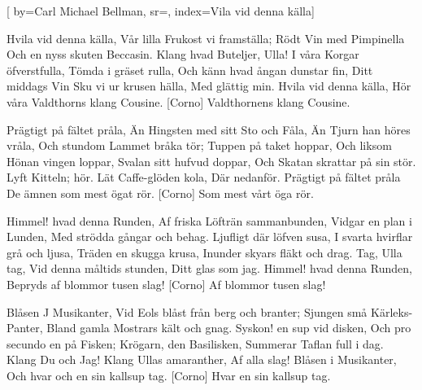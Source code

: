 

[ 		%
	by={Carl Michael Bellman},					%
	sr={},					%
	index={Vila vid denna källa}]						%

\beginverse*						%
Hvila vid denna källa,
Vår lilla Frukost vi framställa;
Rödt Vin med Pimpinella
Och en nyss skuten Beccasin.
Klang hvad Buteljer, Ulla!
I våra Korgar öfverstfulla,
Tömda i gräset rulla,
Och känn hvad ångan dunstar fin,
Ditt middags Vin
Sku vi ur krusen hälla,
Med glättig min.
Hvila vid denna källa,
Hör våra Valdthorns klang Cousine.
[Corno]
Valdthornens klang Cousine.
\endverse							%

\beginverse*						%
Prägtigt på fältet pråla,
Än Hingsten med sitt Sto och Fåla,
Än Tjurn han höres vråla,
Och stundom Lammet bråka tör;
Tuppen på taket hoppar,
Och liksom Hönan vingen loppar,
Svalan sitt hufvud doppar,
Och Skatan skrattar på sin stör.
Lyft Kitteln; hör.
Lät Caffe-glöden kola,
Där nedanför.
Prägtigt på fältet pråla
De ämnen som mest ögat rör.
[Corno]
Som mest vårt öga rör.
\endverse							%

\newpage
\beginverse*						%
Himmel! hvad denna Runden,
Af friska Löfträn sammanbunden,
Vidgar en plan i Lunden,
Med strödda gångar och behag.
Ljufligt där löfven susa,
I svarta hvirflar grå och ljusa,
Träden en skugga krusa,
Inunder skyars fläkt och drag.
Tag, Ulla tag,
Vid denna måltids stunden,
Ditt glas som jag.
Himmel! hvad denna Runden,
Bepryds af blommor tusen slag!
[Corno]
Af blommor tusen slag! 
\endverse							%

\beginverse*						%
Blåsen J Musikanter,
Vid Eols blåst från berg och branter;
Sjungen små Kärleks-Panter,
Bland gamla Mostrars kält och gnag.
Syskon! en sup vid disken,
Och pro secundo en på Fisken;
Krögarn, den Basilisken,
Summerar Taflan full i dag.
Klang Du och Jag!
Klang Ullas amaranther,
Af alla slag!
Blåsen i Musikanter,
Och hvar och en sin kallsup tag.
[Corno]
Hvar en sin kallsup tag.
\endverse							%

\endsong							%